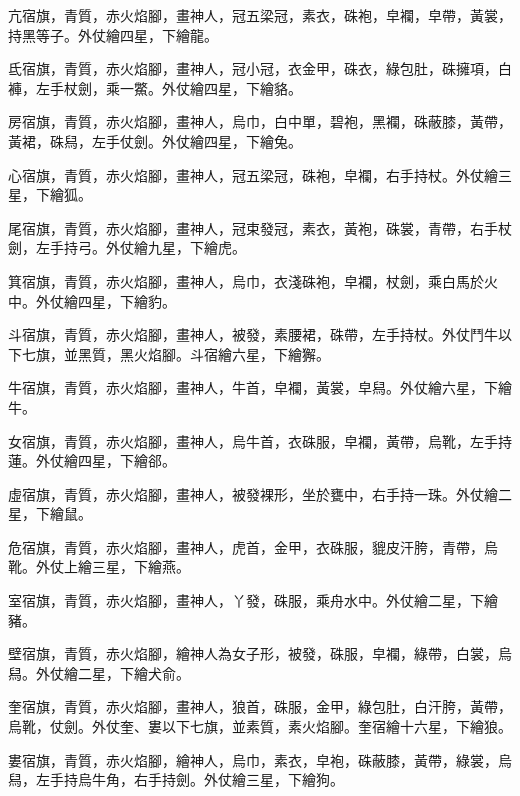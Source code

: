 \begin{pinyinscope}
 亢宿旗，青質，赤火焰腳，畫神人，冠五梁冠，素衣，硃袍，皁襴，皁帶，黃裳，持黑等子。外仗繪四星，下繪龍。



 氐宿旗，青質，赤火焰腳，畫神人，冠小冠，衣金甲，硃衣，綠包肚，硃擁項，白褲，左手杖劍，乘一鱉。外仗繪四星，下繪貉。



 房宿旗，青質，赤火焰腳，畫神人，烏巾，白中單，碧袍，黑襴，硃蔽膝，黃帶，黃裙，硃舄，左手仗劍。外仗繪四星，下繪兔。



 心宿旗，青質，赤火焰腳，畫神人，冠五梁冠，硃袍，皁襴，右手持杖。外仗繪三星，下繪狐。



 尾宿旗，青質，赤火焰腳，畫神人，冠束發冠，素衣，黃袍，硃裳，青帶，右手杖劍，左手持弓。外仗繪九星，下繪虎。



 箕宿旗，青質，赤火焰腳，畫神人，烏巾，衣淺硃袍，皁襴，杖劍，乘白馬於火中。外仗繪四星，下繪豹。



 斗宿旗，青質，赤火焰腳，畫神人，被發，素腰裙，硃帶，左手持杖。外仗鬥牛以下七旗，並黑質，黑火焰腳。斗宿繪六星，下繪獬。



 牛宿旗，青質，赤火焰腳，畫神人，牛首，皁襴，黃裳，皁舄。外仗繪六星，下繪牛。



 女宿旗，青質，赤火焰腳，畫神人，烏牛首，衣硃服，皁襴，黃帶，烏靴，左手持蓮。外仗繪四星，下繪郤。



 虛宿旗，青質，赤火焰腳，畫神人，被發裸形，坐於甕中，右手持一珠。外仗繪二星，下繪鼠。



 危宿旗，青質，赤火焰腳，畫神人，虎首，金甲，衣硃服，貔皮汗胯，青帶，烏靴。外仗上繪三星，下繪燕。



 室宿旗，青質，赤火焰腳，畫神人，丫發，硃服，乘舟水中。外仗繪二星，下繪豬。



 壁宿旗，青質，赤火焰腳，繪神人為女子形，被發，硃服，皁襴，綠帶，白裳，烏舄。外仗繪二星，下繪犬俞。



 奎宿旗，青質，赤火焰腳，畫神人，狼首，硃服，金甲，綠包肚，白汗胯，黃帶，烏靴，仗劍。外仗奎、婁以下七旗，並素質，素火焰腳。奎宿繪十六星，下繪狼。



 婁宿旗，青質，赤火焰腳，繪神人，烏巾，素衣，皁袍，硃蔽膝，黃帶，綠裳，烏舄，左手持烏牛角，右手持劍。外仗繪三星，下繪狗。




\end{pinyinscope}
